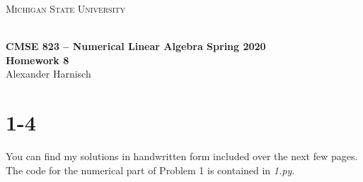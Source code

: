 \documentclass[a4paper, 11pt]{article}
\begin{document}
\noindent
\centerline{\small{\textsc{Michigan State University}}} \\
\large{\textbf{CMSE 823 – Numerical Linear Algebra \hfill Spring 2020 \\
Homework 8}} \\
Alexander Harnisch \\
\noindent\makebox[\linewidth]{\rule{\textwidth}{0.4pt}}

\section*{1-4}
You can find my solutions in handwritten form included over the next few
pages. The code for the numerical part of Problem 1 is contained in
\textit{1.py}.


\FloatBarrier
\end{document}
